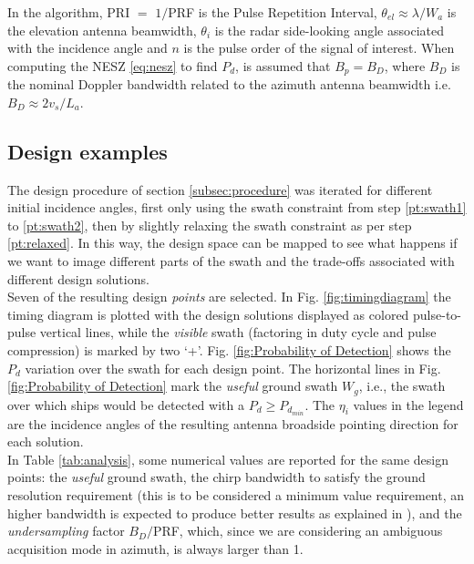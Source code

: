 \documentclass[conference,a4paper]{IEEEtran}
\begin{document}
    In the algorithm, PRI $=$ $1/$PRF is the Pulse Repetition Interval, $\theta_{el} \approx \lambda/W_a$ is the elevation antenna beamwidth, $\theta_i$ is the radar side-looking angle associated with the incidence angle and $n$ is the pulse order of the signal of interest.
    When computing the NESZ \eqref{eq:nesz} to find $P_d$, is assumed that $B_p = B_D$, where $B_D$ is the nominal Doppler bandwidth related to the azimuth antenna beamwidth i.e. $B_D \approx 2 v_s / L_a$.

    \subsection{Design examples}
    \label{subsec:analysis}
    The design procedure of section \ref{subsec:procedure} was iterated for different initial incidence angles, first only using the swath constraint from step \ref{pt:swath1} to \ref{pt:swath2}, then by slightly relaxing the swath constraint as per step \ref{pt:relaxed}.
    In this way, the design space can be mapped to see what happens if we want to image different parts of the swath and the trade-offs associated with different design solutions.\\
    Seven of the resulting design \emph{points} are selected.
    In Fig. \ref{fig:timingdiagram} the timing diagram is plotted with the design solutions displayed as colored pulse-to-pulse vertical lines, while the \emph{visible} swath (factoring in duty cycle and pulse compression) is marked by two `+'.
    Fig. \ref{fig:Probability of Detection} shows the $P_d$ variation over the swath for each design point.
    The horizontal lines in Fig. \ref{fig:Probability of Detection} mark the \emph{useful} ground swath $W_g$, i.e., the swath over which ships would be detected with a $P_d \geq P_{d_{min}}$.%
    The $\eta_i$ values in the legend are the incidence angles of the resulting antenna broadside pointing direction for each solution.\\
    In Table \ref{tab:analysis}, some numerical values are reported for the same design points: the \emph{useful} ground swath, the chirp bandwidth to satisfy the ground resolution requirement (this is to be considered a minimum value requirement, an higher bandwidth is expected to produce better results as explained in \cite{DLRjournal}), and the \emph{undersampling} factor $B_D/$PRF, which, since we are considering an ambiguous acquisition mode in azimuth, is always larger than 1.
\end{document}
